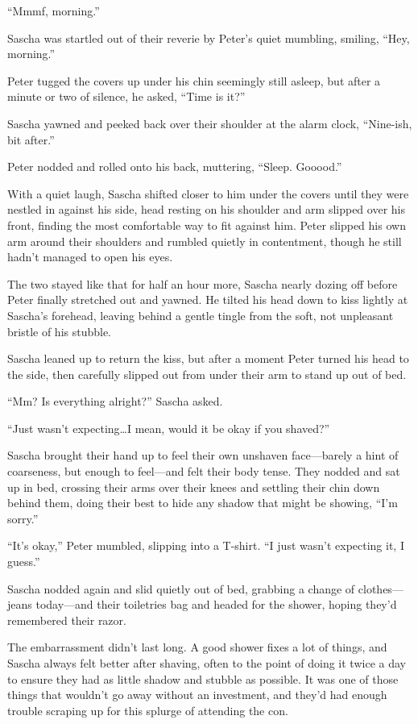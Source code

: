``Mmmf, morning.''

Sascha was startled out of their reverie by Peter's quiet mumbling, smiling, ``Hey, morning.''

Peter tugged the covers up under his chin seemingly still asleep, but after a minute or two of silence, he asked, ``Time is it?''

Sascha yawned and peeked back over their shoulder at the alarm clock, ``Nine-ish, bit after.''

Peter nodded and rolled onto his back, muttering, ``Sleep. Gooood.''

With a quiet laugh, Sascha shifted closer to him under the covers until they were nestled in against his side, head resting on his shoulder and arm slipped over his front, finding the most comfortable way to fit against him. Peter slipped his own arm around their shoulders and rumbled quietly in contentment, though he still hadn't managed to open his eyes.

The two stayed like that for half an hour more, Sascha nearly dozing off before Peter finally stretched out and yawned. He tilted his head down to kiss lightly at Sascha's forehead, leaving behind a gentle tingle from the soft, not unpleasant bristle of his stubble.

Sascha leaned up to return the kiss, but after a moment Peter turned his head to the side, then carefully slipped out from under their arm to stand up out of bed.

``Mm? Is everything alright?'' Sascha asked.

``Just wasn't expecting\ldots{}I mean, would it be okay if you shaved?''

Sascha brought their hand up to feel their own unshaven face---barely a hint of coarseness, but enough to feel---and felt their body tense. They nodded and sat up in bed, crossing their arms over their knees and settling their chin down behind them, doing their best to hide any shadow that might be showing, ``I'm sorry.''

``It's okay,'' Peter mumbled, slipping into a T-shirt. ``I just wasn't expecting it, I guess.''

Sascha nodded again and slid quietly out of bed, grabbing a change of clothes---jeans today---and their toiletries bag and headed for the shower, hoping they'd remembered their razor.

\secdiv{}

The embarrassment didn't last long. A good shower fixes a lot of things, and Sascha always felt better after shaving, often to the point of doing it twice a day to ensure they had as little shadow and stubble as possible. It was one of those things that wouldn't go away without an investment, and they'd had enough trouble scraping up for this splurge of attending the con.

